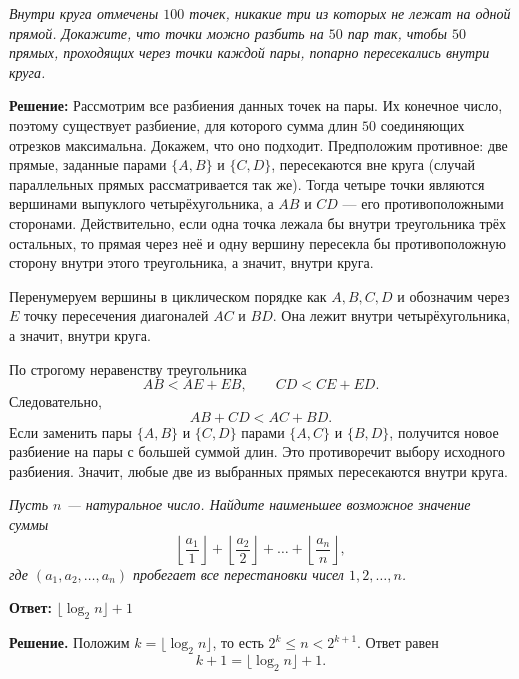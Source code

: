 \textit{Внутри круга отмечены $100$ точек, никакие три из которых не лежат на одной прямой. Докажите, что точки можно разбить на $50$ пар так, чтобы $50$ прямых, проходящих через точки каждой пары, попарно пересекались внутри круга.}

\textbf{Решение:}
Рассмотрим все разбиения данных точек на пары. Их конечное число, поэтому существует разбиение, для которого сумма длин $50$ соединяющих отрезков максимальна. Докажем, что оно подходит.  Предположим противное: две прямые, заданные парами $\{A,B\}$ и $\{C,D\}$, пересекаются вне круга (случай параллельных прямых рассматривается так же). Тогда четыре точки являются вершинами выпуклого четырёхугольника, а $AB$ и $CD$ --- его противоположными сторонами. Действительно, если одна точка лежала бы внутри треугольника трёх остальных, то прямая через неё и одну вершину пересекла бы противоположную сторону внутри этого треугольника, а значит, внутри круга.

Перенумеруем вершины в циклическом порядке как $A,B,C,D$ и обозначим через $E$ точку пересечения диагоналей $AC$ и $BD$. Она лежит внутри четырёхугольника, а значит, внутри круга.

По строгому неравенству треугольника
\[
 AB<AE+EB,\qquad CD<CE+ED.
\]
Следовательно,
\[
 AB+CD<AC+BD.
\]
Если заменить пары $\{A,B\}$ и $\{C,D\}$ парами $\{A,C\}$ и $\{B,D\}$, получится новое разбиение на пары с большей суммой длин. Это противоречит выбору исходного разбиения. Значит, любые две из выбранных прямых пересекаются внутри круга.


\textit{Пусть $n$ --- натуральное число. Найдите наименьшее возможное значение суммы
\[
  \left\lfloor\frac{a_1}{1}\right\rfloor+
  \left\lfloor\frac{a_2}{2}\right\rfloor+\dots+
  \left\lfloor\frac{a_n}{n}\right\rfloor,
\]
где $(a_1,a_2,\dots,a_n)$ пробегает все перестановки чисел $1,2,\dots,n$.}

\textbf{Ответ:} $\lfloor\log_2 n\rfloor+1$

\textbf{Решение.} Положим $k=\lfloor\log_2 n\rfloor$, то есть $2^k\leq n<2^{k+1}$. Ответ равен
\[
  \boxed{k+1=\lfloor\log_2 n\rfloor+1}.
\]

